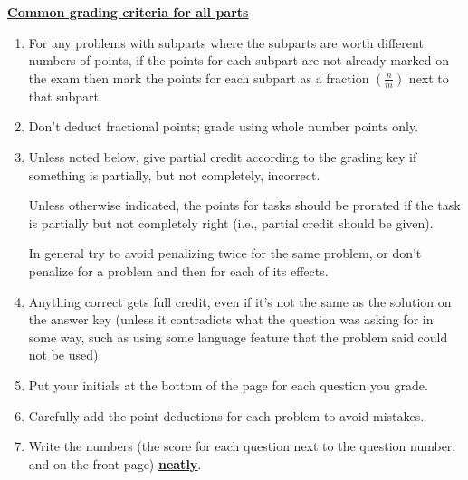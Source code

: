 \documentclass[11pt,fleqn]{article}
\begin{document}
{\begin{info}{\textbf{\underline{\Large Common grading criteria for all
                 parts}}}
\begin{enumerate}
        \item For any problems with subparts where the subparts are worth
              different numbers of points, if the points for each subpart
              are not already marked on the exam then mark the points for each
              subpart as a fraction $\left(\frac{n}{m}\right)$ next to that
              subpart.

        \item Don't deduct fractional points; grade using whole number points
              only.

        \item Unless noted below, give partial credit according to the
              grading key if something is partially, but not completely,
              incorrect.

              Unless otherwise indicated, the points for tasks should be
              prorated if the task is partially but not completely right
              (i.e., partial credit should be given).

              In general try to avoid penalizing twice for the same problem,
              or don't penalize for a problem and then for each of its
              effects.


        \item Anything correct gets full credit, even if it's not the same as
              the solution on the answer key (unless it contradicts what the
              question was asking for in some way, such as using some language
              feature that the problem said could not be used).

        \item Put your initials at the bottom of the page for each question you
              grade.

        \item Carefully add the point deductions for each problem to avoid
              mistakes.

        \item Write the numbers (the score for each question next to the
              question number, and on the front page)
              \textbf{\underline{\underline{neatly}}}.


\end{enumerate}
\end{info}}
\end{document}
